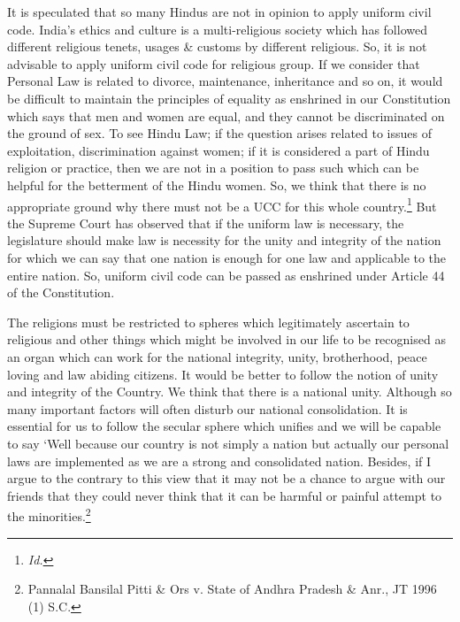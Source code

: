 \begin{multicols}{2}
\noi
It is speculated that so many Hindus are not in opinion to apply uniform civil code. India’s
ethics and culture is a multi-religious society which has followed different religious tenets,
usages \& customs by different religious. So, it is not advisable to apply uniform civil code for
religious group. If we consider that Personal Law is related to divorce, maintenance,
inheritance and so on, it would be difficult to maintain the principles of equality as enshrined
in our Constitution which says that men and women are equal, and they cannot be
discriminated on the ground of sex. To see Hindu Law; if the question arises related to issues
of exploitation, discrimination against women; if it is considered a part of Hindu religion or
practice, then we are not in a position to pass such which can be helpful for the betterment of
the Hindu women. So, we think that there is no appropriate ground why there must not be a
UCC for this whole country.\footnote{\it Id.} But the Supreme Court has observed that if the uniform law is
necessary, the legislature should make law is necessity for the unity and integrity of the
nation for which we can say that one nation is enough for one law and applicable to the entire nation. So, uniform civil code can be passed as enshrined under Article 44 of the
Constitution. 

\noi
The religions must be restricted to spheres which legitimately ascertain to religious and other
things which might be involved in our life to be recognised as an organ which can work for
the national integrity, unity, brotherhood, peace loving and law abiding citizens. It would be
better to follow the notion of unity and integrity of the Country. We think that there is a
national unity. Although so many important factors will often disturb our national
consolidation. It is essential for us to follow the secular sphere which unifies and we will be
capable to say ‘Well because our country is not simply a nation but actually our personal laws
are implemented as we are a strong and consolidated nation. Besides, if I argue to the
contrary to this view that it may not be a chance to argue with our friends that they could
never think that it can be harmful or painful attempt to the minorities.\footnote{ Pannalal Bansilal Pitti \& Ors v. State of Andhra Pradesh \& Anr., JT 1996 (1) S.C.}


\end{multicols}
